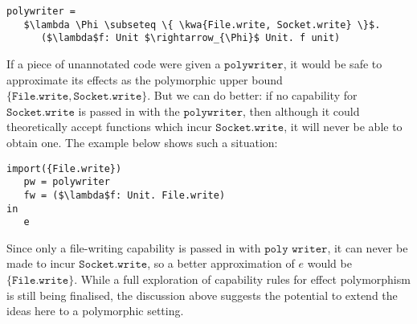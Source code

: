 \documentclass[sigplan,10pt,review]{acmart}\settopmatter{printfolios=true,printccs=false,printacmref=false}
\newcommand{\kwa}[1]{\mathtt{#1}}
\begin{document}
\begin{lstlisting}
polywriter =
   $\lambda \Phi \subseteq \{ \kwa{File.write, Socket.write} \}$.
      ($\lambda$f: Unit $\rightarrow_{\Phi}$ Unit. f unit)
\end{lstlisting}

If a piece of unannotated code were given a $\kwa{polywriter}$, it would be safe to approximate its effects as the polymorphic upper bound $\{ \kwa{File.write, Socket.write} \}$. But we can do better: if no capability for $\kwa{Socket.write}$ is passed in with the $\kwa{polywriter}$, then although it could theoretically accept functions which incur $\kwa{Socket.write}$, it will never be able to obtain one. The example below shows such a situation:

\begin{lstlisting}
import({File.write}) 
   pw = polywriter
   fw = ($\lambda$f: Unit. File.write)
in
   e
\end{lstlisting}

Since only a file-writing capability is passed in with $\kwa{poly}$ $\kwa{writer}$, it can never be made to incur $\kwa{Socket.write}$, so a better approximation of $e$ would be $\{ \kwa{File.write} \}$.
While a full exploration of capability rules for effect polymorphism is still being finalised, the discussion above suggests the potential to extend the ideas here to a polymorphic setting.
\end{document}

